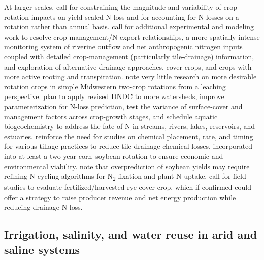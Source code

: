 \documentclass[11pt]{article}
\begin{document}
At larger scales, \textcite{Zhao2016} call for constraining the magnitude and variability of crop-rotation impacts on yield-scaled N loss and for accounting for N losses on a rotation rather than annual basis. \textcite{Raymond2012} call for additional experimental and modeling work to resolve crop-management/N-export relationships, a more spatially intense monitoring system of riverine outflow and net anthropogenic nitrogen inputs coupled with detailed crop-management (particularly tile-drainage) information, and exploration of alternative drainage approaches, cover crops, and crops with more active rooting and transpiration. \textcite{Pasley2021} note very little research on more desirable rotation crops in simple Midwestern two-crop rotations from a leaching perspective. \textcite{Deng2011} plan to apply revised DNDC to more watersheds, improve parameterization for N-loss prediction, test the variance of surface-cover and management factors across crop-growth stages, and schedule aquatic biogeochemistry to address the fate of N in streams, rivers, lakes, reservoirs, and estuaries. \textcite{Kanwar1997} reinforce the need for studies on chemical placement, rate, and timing for various tillage practices to reduce tile-drainage chemical losses, incorporated into at least a two-year corn--soybean rotation to ensure economic and environmental viability. \textcite{Bakhsh2004} note that overprediction of soybean yields may require refining N-cycling algorithms for N\textsubscript{2} fixation and plant N-uptake. \textcite{Malone2018} call for field studies to evaluate fertilized/harvested rye cover crop, which if confirmed could offer a strategy to raise producer revenue and net energy production while reducing drainage N loss.

\subsection{Irrigation, salinity, and water reuse in arid and saline systems}
\end{document}
